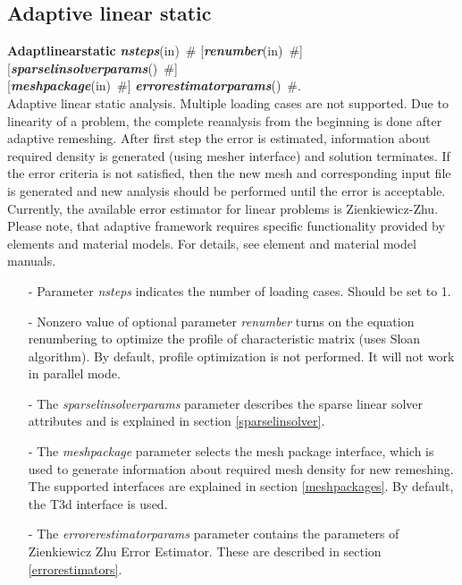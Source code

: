 \documentclass[draft]{article}
\newcommand{\param}[1]{{\em #1}}
\newcommand{\keywordnotype}[1]{\mbox{{\it{\bf{#1}}}}}
\newcommand{\keyword}[2]{\mbox{{\keywordnotype{#1}\tiny (#2)}}}
\newcommand{\entKeywordInst}[1]{\mbox{{\bf{{#1}}}}}
\newcommand{\field}[2]{\mbox{\keyword{#1}{#2}~\#}}
\newcommand{\optField}[2]{\mbox{[\field{#1}{#2}]}}
\begin{document}
\subsection{Adaptive linear static}
\label{AdaptiveLinearStatic}
\entKeywordInst{Adaptlinearstatic} \field{nsteps}{in} \optField{renumber}{in}
\optField{sparselinsolverparams}{} \\\optField{meshpackage}{in} \field{errorestimatorparams}{}.\\
Adaptive linear static analysis. Multiple loading cases are not
supported. Due to linearity of a problem, the complete reanalysis from
the beginning is done after adaptive remeshing.
After first step the error is estimated, information about required density is generated
(using mesher interface) and solution terminates. If the error
criteria is not satisfied, then the new mesh
and corresponding input file is generated and new analysis should be
performed until the error is acceptable.
Currently, the available error estimator for linear problems is
Zienkiewicz-Zhu. Please note, that adaptive framework requires
specific functionality provided by elements and material models. For
details, see element and material model manuals.
\begin{itemize}
\item[-]
Parameter \param{nsteps} indicates the number of loading cases.
Should be set to 1.
\item[-]
Nonzero value of optional parameter \param{renumber} turns on the
equation renumbering to optimize the profile of characteristic matrix
(uses Sloan algorithm). By default, profile optimization is not
performed. It will not work in parallel mode.
\item[-]
The  \param{sparselinsolverparams} parameter describes the sparse
linear solver attributes and is explained in section \ref{sparselinsolver}.
\item[-]
The \param{meshpackage} parameter selects the mesh package interface,
which is used to generate information about required mesh density for
new remeshing. The supported interfaces are explained in section
\ref{meshpackages}. By default, the T3d interface is used.
\item[-]
The \param{errorerestimatorparams} parameter contains the parameters
of Zien\-kie\-wicz Zhu Error Estimator. These are described in section \ref{errorestimators}.
\end{itemize}
\end{document}
